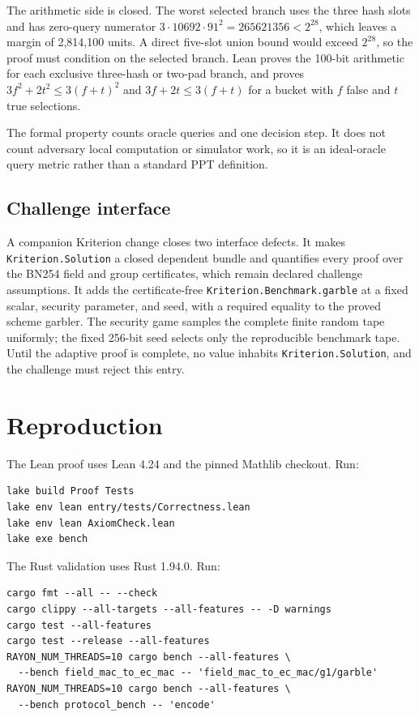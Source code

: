 \documentclass[10pt]{article}
\begin{document}
The arithmetic side is closed.
The worst selected branch uses the three hash slots and has zero-query numerator $3\cdot10692\cdot91^2=265621356<2^{28}$, which leaves a margin of 2,814,100 units.
A direct five-slot union bound would exceed $2^{28}$, so the proof must condition on the selected branch.
Lean proves the 100-bit arithmetic for each exclusive three-hash or two-pad branch, and proves $3f^2+2t^2\le3(f+t)^2$ and $3f+2t\le3(f+t)$ for a bucket with $f$ false and $t$ true selections.

The formal property counts oracle queries and one decision step.
It does not count adversary local computation or simulator work, so it is an ideal-oracle query metric rather than a standard PPT definition.

\subsection{Challenge interface}

A companion Kriterion change closes two interface defects.
It makes \texttt{Kriterion.Solution} a closed dependent bundle and quantifies every proof over the BN254 field and group certificates, which remain declared challenge assumptions.
It adds the certificate-free \texttt{Kriterion.Benchmark.garble} at a fixed scalar, security parameter, and seed, with a required equality to the proved scheme garbler.
The security game samples the complete finite random tape uniformly; the fixed 256-bit seed selects only the reproducible benchmark tape.
Until the adaptive proof is complete, no value inhabits \texttt{Kriterion.Solution}, and the challenge must reject this entry.

\section{Reproduction}

The Lean proof uses Lean 4.24 and the pinned Mathlib checkout.
Run:
\begingroup\small
\begin{verbatim}
lake build Proof Tests
lake env lean entry/tests/Correctness.lean
lake env lean AxiomCheck.lean
lake exe bench
\end{verbatim}
\endgroup

The Rust validation uses Rust 1.94.0.
Run:
\begingroup\small
\begin{verbatim}
cargo fmt --all -- --check
cargo clippy --all-targets --all-features -- -D warnings
cargo test --all-features
cargo test --release --all-features
RAYON_NUM_THREADS=10 cargo bench --all-features \
  --bench field_mac_to_ec_mac -- 'field_mac_to_ec_mac/g1/garble'
RAYON_NUM_THREADS=10 cargo bench --all-features \
  --bench protocol_bench -- 'encode'
\end{verbatim}
\endgroup
\end{document}
